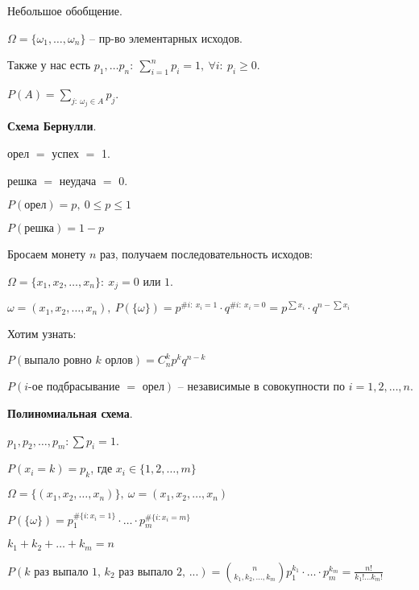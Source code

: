 \begin{remark}
    Небольшое обобщение.

    $\Omega = \{ \omega_1, \dots, \omega_n \}$ -- пр-во элементарных исходов.

    Также у нас есть $p_1, \dots p_n: \ \sum_{i=1}^{n} p_i = 1, \ \forall i: \ p_i \geq 0$.

    $P(A) = \sum_{j: \ \omega_j \in A} p_j$.
\end{remark}

\begin{theorem}
    \textbf{Схема Бернулли}.

    орел $=$ успех $=$ 1.

    решка $=$ неудача $=$ 0.

    $P(\text{орел}) = p, \ 0 \leq p \leq 1$
    
    $P(\text{решка}) = 1 - p$

    Бросаем монету $n$ раз, получаем последовательность исходов:

    $\Omega = \{ x_1, x_2, \dots, x_n \}: \ x_j = 0 \text{ или } 1$.

    $\omega = (x_1, x_2, \dots, x_n), \ P(\{ \omega \}) = p^{\# i: \ x_i = 1} \cdot q^{\# i: \ x_i = 0} = p^{\sum x_i} \cdot q^{n - \sum x_i}$

    Хотим узнать:
    
    $P(\text{выпало ровно } k \text{ орлов}) = C_{n}^{k} p^k q^{n - k}$
    
    $P(i\text{-ое подбрасывание } = \text{ орел})$ -- независимые в совокупности по $i = 1, 2, \dots, n$.
\end{theorem}

\begin{theorem}
    \textbf{Полиномиальная схема}.

    $p_1, p_2, \dots, p_m: \sum p_i = 1$.

    $P(x_i = k) = p_k$, где $x_i \in \{ 1, 2, \dots, m \}$

    $\Omega = \{(x_1, x_2, \dots, x_n)\}, \ \omega = (x_1, x_2, \dots, x_n)$

    $P(\{ \omega \}) = p_1^{\# \{ i: x_i = 1 \}} \cdot \dots \cdot p_m^{\# \{ i: x_i = m \}}$

    $k_1 + k_2 + \dots + k_m = n$

    
    $P(k \text{ раз выпало 1, } k_2 \text{ раз выпало 2, ...}) = \binom{n}{k_1, k_2, \dots, k_m} p_1^{k_1} \cdot \dots \cdot p_m^{k_m} = \frac{n!}{k_1! \dots k_m!}$
\end{theorem}









